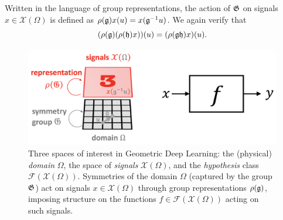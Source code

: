 Written in the language of group representations, the action of ${\mathfrak{G}}$ on signals $x \in \mathcal{X}(\Omega)$ is defined as $\rho({\mathfrak{g}}) x(u) = x({\mathfrak{g}}^{-1} u)$.
%
We again verify that 
$$
(\rho({\mathfrak{g}}) (\rho({\mathfrak{h}}) x))(u) = (\rho({\mathfrak{g}} {\mathfrak{h}}) x)(u).
$$
%







\begin{figure}
    \centering
    \includegraphics[width=0.75\linewidth]{figures/geom_prior.png}%
    \caption{
    Three spaces of interest in Geometric Deep Learning: the (physical) {\em domain} $\Omega$, the space of {\em signals} $\mathcal{X}(\Omega)$, and the {\em hypothesis} class $\mathcal{F}(\mathcal{X}(\Omega))$. 
    Symmetries of the domain $\Omega$ (captured by the group ${\mathfrak{G}}$) act on signals $x\in \mathcal{X}(\Omega)$ through group representations $\rho({\mathfrak{g}})$, imposing structure on the functions $f\in \mathcal{F}(\mathcal{X}(\Omega))$ acting on such signals.
    }
    \label{fig:symmetryactors}
\end{figure}


